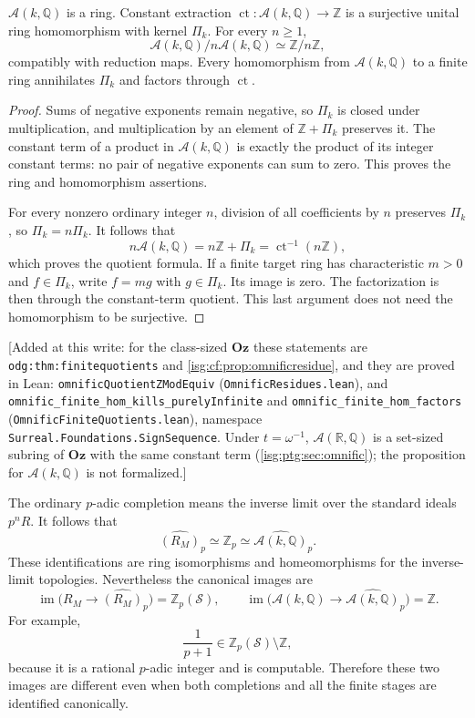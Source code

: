 \documentclass[11pt]{article}
\theoremstyle{definition}
\theoremstyle{remark}
\newcommand{\Oz}{\ensuremath{\mathbf{Oz}}}
\newcommand{\R}{\mathbb{R}}
\newcommand{\Z}{\mathbb{Z}}
\newcommand{\ct}{\operatorname{ct}}
\newcommand{\Q}{\mathbb{Q}}
\newcommand{\im}{\operatorname{im}}
\newcommand{\Asc}{\mathcal{A}}
\newcommand{\Zp}{\mathbb{Z}_p}
\newcommand{\replabel}[1]{\nolinkurl{#1}}
\newcommand{\fn}[1]{\nolinkurl{#1}}
\begin{document}
\begin{proposition}[The ordinary residue tower of $\Asc(k,\Q)$]\label{isg:ptg:prop:tail}
$\Asc(k,\Q)$ is a ring. Constant extraction $\ct:\Asc(k,\Q)\to\Z$ is a
surjective unital ring homomorphism with kernel $\Pi_k$. For every
$n\geq1$,
\[
 \Asc(k,\Q)/n\Asc(k,\Q)\simeq\Z/n\Z,
\]
compatibly with reduction maps. Every homomorphism from $\Asc(k,\Q)$ to a
finite ring annihilates $\Pi_k$ and factors through $\ct$.
\end{proposition}
\begin{proof}
Sums of negative exponents remain negative, so $\Pi_k$ is closed under
multiplication, and multiplication by an element of $\Z+\Pi_k$ preserves
it. The constant term of a product in $\Asc(k,\Q)$ is exactly the product
of its integer constant terms: no pair of negative exponents can sum to
zero. This proves the ring and homomorphism assertions.

For every nonzero ordinary integer $n$, division of all coefficients by $n$
preserves $\Pi_k$, so $\Pi_k=n\Pi_k$. It follows that
\[
 n\Asc(k,\Q)=n\Z+\Pi_k=\ct^{-1}(n\Z),
\]
which proves the quotient formula. If a finite target ring has
characteristic $m>0$ and $f\in\Pi_k$, write $f=mg$ with $g\in\Pi_k$. Its
image is zero. The factorization is then through the constant-term
quotient. This last argument does not need the homomorphism to be
surjective.
\end{proof}

\textup{[}Added at this write: for the class-sized $\Oz$ these statements
are \replabel{odg:thm:finitequotients} and \cref{isg:cf:prop:omnificresidue},
and they are proved in Lean: \fn{omnificQuotientZModEquiv}
(\fn{OmnificResidues.lean}), and \fn{omnific_finite_hom_kills_purelyInfinite}
and \fn{omnific_finite_hom_factors} (\fn{OmnificFiniteQuotients.lean}),
namespace \fn{Surreal.Foundations.SignSequence}. Under $t=\omega^{-1}$,
$\Asc(\R,\Q)$ is a set-sized subring of $\Oz$ with the same constant term
(\cref{isg:ptg:sec:omnific}); the proposition for $\Asc(k,\Q)$ is not
formalized.\textup{]}

The ordinary $p$-adic completion means the inverse limit over the standard
ideals $p^nR$. It follows that
\begin{equation}\label{isg:ptg:eq:samecompletion}
 \widehat{(R_M)}_p\simeq\Zp\simeq\widehat{\Asc(k,\Q)}_p.
\end{equation}
These identifications are ring isomorphisms and homeomorphisms for the
inverse-limit topologies. Nevertheless the canonical images are
\begin{equation}\label{isg:ptg:eq:differentimages}
 \im\bigl(R_M\to\widehat{(R_M)}_p\bigr)=\Zp(\mathcal S),\qquad
 \im\bigl(\Asc(k,\Q)\to\widehat{\Asc(k,\Q)}_p\bigr)=\Z.
\end{equation}
For example,
\[
 \frac1{p+1}\in\Zp(\mathcal S)\setminus\Z,
\]
because it is a rational $p$-adic integer and is computable. Therefore
these two images are different even when both completions and all the
finite stages are identified canonically.
\end{document}

